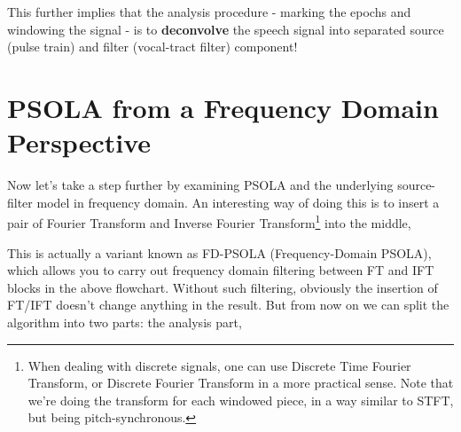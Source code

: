 \documentclass{article}
\begin{document}
This further implies that the analysis procedure - marking the epochs and windowing the signal - is to \textbf{deconvolve} the speech signal into separated source (pulse train) and filter (vocal-tract filter) component!

\section{PSOLA from a Frequency Domain Perspective}

Now let's take a step further by examining PSOLA and the underlying source-filter model in frequency domain. An interesting way of doing this is to insert a pair of Fourier Transform and Inverse Fourier Transform\footnote{When dealing with discrete signals, one can use Discrete Time Fourier Transform, or Discrete Fourier Transform in a more practical sense. Note that we're doing the transform for each windowed piece, in a way similar to STFT, but being pitch-synchronous.} into the middle,

\begin{center}
\end{center}

This is actually a variant known as FD-PSOLA (Frequency-Domain PSOLA), which allows you to carry out frequency domain filtering between FT and IFT blocks in the above flowchart. Without such filtering, obviously the insertion of FT/IFT doesn't change anything in the result. But from now on we can split the algorithm into two parts: the analysis part,

\begin{center}
\end{center}
\end{document}
